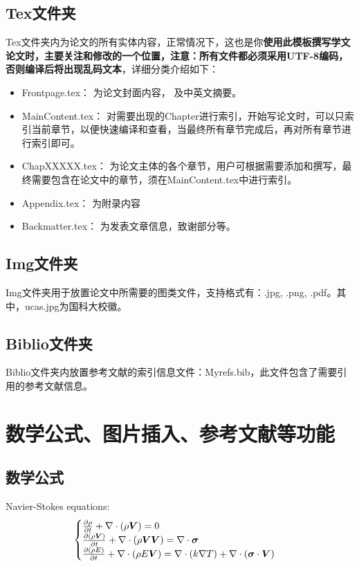 \subsection{Tex文件夹}

Tex文件夹内为论文的所有实体内容，正常情况下，这也是你\textbf{使用此模板撰写学文论文时，主要关注和修改的一个位置，注意：所有文件都必须采用UTF-8编码，否则编译后将出现乱码文本}，详细分类介绍如下：

\begin{itemize}
  \item Frontpage.tex： 为论文封面内容， 及中英文摘要。
  \item Main\textunderscore Content.tex： 对需要出现的Chapter进行索引，开始写论文时，可以只索引当前章节，以便快速编译和查看，当最终所有章节完成后，再对所有章节进行索引即可。
  \item Chap\textunderscore XXXXX.tex： 为论文主体的各个章节，用户可根据需要添加和撰写，最终需要包含在论文中的章节，须在Main\textunderscore Content.tex中进行索引。
  \item Appendix.tex： 为附录内容
  \item Backmatter.tex： 为发表文章信息，致谢部分等。
\end{itemize}

\subsection{Img文件夹}

Img文件夹用于放置论文中所需要的图类文件，支持格式有：.jpg, .png, .pdf。其中，ucas.jpg为国科大校徽。

\subsection{Biblio文件夹}

Biblio文件夹内放置参考文献的索引信息文件：Myrefs.bib，此文件包含了需要引用的参考文献信息。

\section{数学公式、图片插入、参考文献等功能}

\subsection{数学公式}

Navier-Stokes equations:
\begin{equation} \label{eq:ns}
    \begin{cases}
        \frac{\partial \rho}{\partial t} + \nabla\cdot(\rho\boldsymbol{V}) = 0 \\
        \frac{\partial (\rho\boldsymbol{V})}{\partial t} + \nabla\cdot(\rho\boldsymbol{V}\boldsymbol{V}) = \nabla\cdot\boldsymbol{\mathsf{\sigma}}\\
        \frac{\partial (\rho E)}{\partial t} + \nabla\cdot(\rho E\boldsymbol{V}) = \nabla\cdot(k\nabla T) + \nabla\cdot(\boldsymbol{\mathsf{\sigma}}\cdot\boldsymbol{V})
    \end{cases}
\end{equation}

